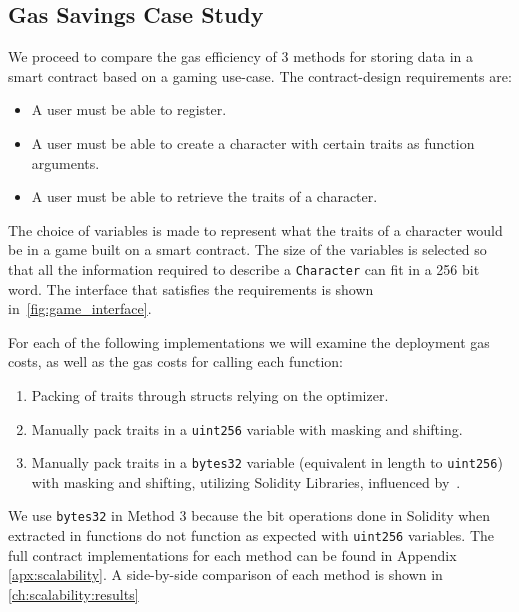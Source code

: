\subsection{Gas Savings Case Study}

We proceed to compare the gas efficiency of 3 methods for storing data in a smart contract based on a gaming use-case. The contract-design requirements are: 
\begin{itemize}
    \item A user must be able to register.
    \item A user must be able to create a character with certain traits as function arguments.
    \item A user must be able to retrieve the traits of a character.
\end{itemize}




The choice of variables is made to represent what the traits of a character would be in a game built on a smart contract. The size of the variables is selected so that all the information required to describe a \texttt{Character} can fit in a 256 bit word. The interface that satisfies the requirements is shown in~\ref{fig:game_interface}.

For each of the following implementations we will examine the deployment gas costs, as well as the gas costs for calling each function:

\begin{enumerate}
    \item Packing of traits through structs relying on the optimizer.
    \item Manually pack traits in a \texttt{uint256} variable with masking and shifting.
    \item Manually pack traits in a \texttt{bytes32} variable (equivalent in length to \texttt{uint256}) with masking and shifting, utilizing Solidity Libraries, influenced by~\cite{virtualstruct}.
\end{enumerate}
We use \texttt{bytes32} in Method 3 because the bit operations done in Solidity when extracted in functions do not function as expected with \texttt{uint256} variables. The full contract implementations for each method can be found in Appendix \ref{apx:scalability}. A side-by-side comparison of each method is shown in \ref{ch:scalability:results}%

